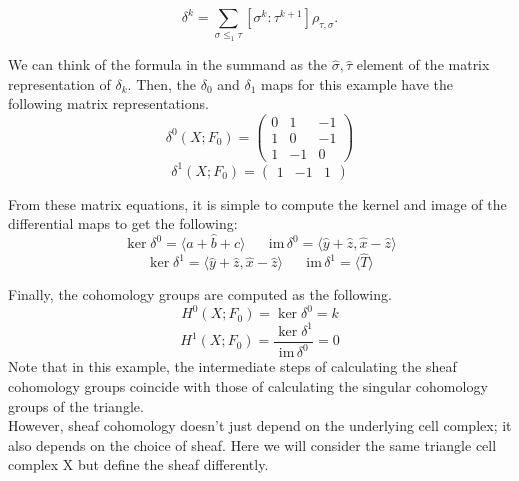 \documentclass{article}
\newcommand{\im}{\textrm{im}\,}
\begin{document}
\begin{equation}
	\delta^k = \sum_{\sigma \leq_1 \tau} [\sigma^k : \tau^{k+1}] \rho_{\tau, \sigma}.
\end{equation}

We can think of the formula in the summand as the $\hat{\sigma}, \hat{\tau}$ element of the matrix representation of $\delta_k$. Then, the $\delta_0$ and $\delta_1$ maps for this example have the following matrix representations.
\begin{equation}
	\delta^0(X;F_0) = \begin{pmatrix} 0 & 1 & -1 \\ 1 & 0 & -1 \\ 1 & -1 & 0 \end{pmatrix}
\end{equation}
\begin{equation}
	\delta^1(X;F_0) = \begin{pmatrix} 1 & -1 & 1 \end{pmatrix}
\end{equation}

From these matrix equations, it is simple to compute the kernel and image of the differential maps to get the following:
\begin{equation}
	\ker \delta^0 = \langle \hat{a} + \hat{b} + \hat{c} \rangle \hspace{20pt} \im \delta^0 = \langle \hat{y} + \hat{z}, \hat{x} - \hat{z} \rangle
\end{equation}
\begin{equation}
\ker \delta^1 = \langle \hat{y} + \hat{z}, \hat{x} - \hat{z} \rangle \hspace{20pt} \im \delta^1 = \langle \hat{T} \rangle
\end{equation}

Finally, the cohomology groups are computed as the following.
\begin{equation}
H^0 (X; F_0) = \ker \delta^0 = k
\end{equation}
\begin{equation}
H^1 (X; F_0) = \frac{\ker \delta^1}{\im \delta^0} = 0
\end{equation}
Note that in this example, the intermediate steps of calculating the sheaf cohomology groups coincide with those of calculating the singular cohomology groups of the triangle.\\

However, sheaf cohomology doesn't just depend on the underlying cell complex; it also depends on the choice of sheaf. Here we will consider the same triangle cell complex X but define the sheaf differently.
\end{document}
